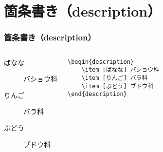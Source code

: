 \section{箇条書き（description）}
\begin{frame}[fragile]
    \frametitle{箇条書き（description）}
    \begin{columns}
        \begin{description}
            \item [ばなな] バショウ科
            \item [りんご] バラ科
            \item [ぶどう] ブドウ科
        \end{description}
        \begin{verbatim}
\begin{description}
    \item [ばなな] バショウ科
    \item [りんご] バラ科
    \item [ぶどう] ブドウ科
\end{description}
        \end{verbatim}
    \end{columns}
\end{frame}
